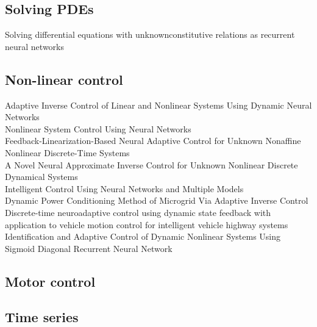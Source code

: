 \documentclass[conference]{IEEEtran}
\begin{document}
\subsection{Solving PDEs}
Solving differential equations with unknownconstitutive relations as recurrent neural networks \\

\subsection{Non-linear control}
Adaptive Inverse Control of Linear and Nonlinear Systems Using Dynamic Neural Networks \cite{plett2003adaptive} \\
Nonlinear System Control Using Neural Networks \\
Feedback-Linearization-Based Neural Adaptive Control for Unknown Nonaffine Nonlinear Discrete-Time Systems \\
A Novel Neural Approximate Inverse Control for Unknown Nonlinear Discrete Dynamical Systems \cite{deng2005a} \\
Intelligent Control Using Neural Networks and Multiple Models \cite{fu2008intelligent} \\
Dynamic Power Conditioning Method of Microgrid Via Adaptive Inverse Control \cite{li2015dynamic} \\
Discrete-time neuroadaptive control using dynamic state feedback with application to vehicle motion control for intelligent vehicle highway systems \cite{kumarawadu2010discrete-time} \\
Identification and Adaptive Control of Dynamic Nonlinear Systems Using Sigmoid Diagonal Recurrent Neural Network \cite{aboueldahab2011identification} \\

\subsection{Motor control}
\subsection{Time series}




\end{document}
